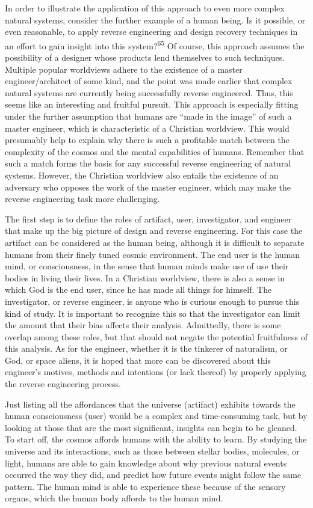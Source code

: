 In order to illustrate the application of this approach to even more
complex natural systems, consider the further example of a human being.
Is it possible, or even reasonable, to apply reverse engineering and
design recovery techniques in an effort to gain insight into this
system?\textsuperscript{65} Of course, this approach assumes the
possibility of a designer whose products lend themselves to such
techniques. Multiple popular worldviews adhere to the existence of a
master engineer/architect of some kind, and the point was made earlier
that complex natural systems are currently being successfully reverse
engineered. Thus, this seems like an interesting and fruitful pursuit.
This approach is especially fitting under the further assumption that
humans are “made in the image” of such a master engineer, which is
characteristic of a Christian worldview. This would presumably help to
explain why there is such a profitable match between the complexity of
the cosmos and the mental capabilities of humans. Remember that such a
match forms the basis for any successful reverse engineering of natural
systems. However, the Christian worldview also entails the existence of
an adversary who opposes the work of the master engineer, which may
make the reverse engineering task more challenging.


The first step is to define the roles of artifact, user, investigator,
and engineer that make up the big picture of design and reverse
engineering. For this case the artifact can be considered as the human
being, although it is difficult to separate humans from their finely
tuned cosmic environment. The end user is the human mind, or
consciousness, in the sense that human minds make use of use their
bodies in living their lives. In a Christian worldview, there is also a
sense in which God is the end user, since he has made all things for
himself. The investigator, or reverse engineer, is anyone who is
curious enough to pursue this kind of study. It is important to
recognize this so that the investigator can limit the amount that their
bias affects their analysis. Admittedly, there is some overlap among
these roles, but that should not negate the potential fruitfulness of
this analysis. As for the engineer, whether it is the tinkerer of
naturalism, or God, or space aliens, it is hoped that more can be
discovered about this engineer’s motives, methods and intentions (or
lack thereof) by properly applying the reverse engineering process. 


Just listing all the affordances that the universe (artifact) exhibits
towards the human consciousness (user) would be a complex and
time-consuming task, but by looking at those that are the most
significant, insights can begin to be gleaned. To start off, the cosmos
affords humans with the ability to learn. By studying the universe and
its interactions, such as those between stellar bodies, molecules, or
light, humans are able to gain knowledge about why previous natural
events occurred the way they did, and predict how future events might
follow the same pattern. The human mind is able to experience these
because of the sensory organs, which the human body affords to the
human mind.


